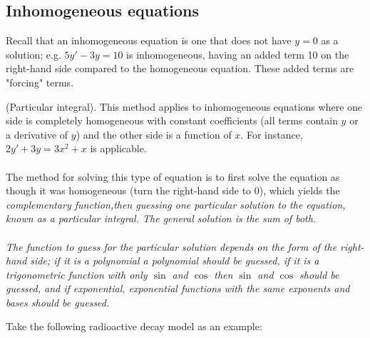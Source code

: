\documentclass{article}
\begin{document}
\subsection{Inhomogeneous equations}
Recall that an inhomogeneous equation is one that does not have $y=0$ as a solution; e.g. $5y' - 3y = 10$ is inhomogeneous, having an added term 10 on the right-hand side compared to the homogeneous equation. These added terms are "forcing" terms.
\begin{method}
(Particular integral). This method applies to inhomogeneous equations where one side is completely homogeneous with constant coefficients (all terms contain $y$ or a derivative of $y$) and the other side is a function of $x$. For instance, $2y' + 3y = 3x^2 + x$ is applicable.\\ \\ 
The method for solving this type of equation is to first solve the equation as though it was homogeneous (turn the right-hand side to 0), which yields the \it{complementary function},\normalfont then guessing one particular solution to the equation, known as a \it{particular integral}.\normalfont
 The general solution is the sum of both. \\ \\ The function to guess for the particular solution depends on the form of the right-hand side; if it is a polynomial a polynomial should be guessed, if it is a trigonometric function with only $\sin$ and $\cos$ then $\sin$ and $\cos$ should be guessed, and if exponential, exponential functions with the same exponents and bases should be guessed.
\end{method}
Take the following radioactive decay model as an example:
\end{document}
